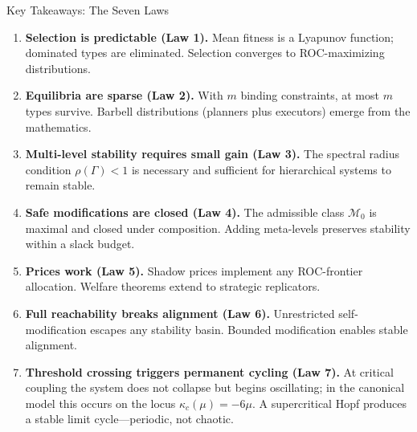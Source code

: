 \documentclass[12pt]{article}
\begin{document}

\begin{takeawaybox}{Key Takeaways: The Seven Laws}
\begin{enumerate}
    \item \textbf{Selection is predictable (Law 1).} Mean fitness is a Lyapunov function; dominated types are eliminated. Selection converges to ROC-maximizing distributions.
    
    \item \textbf{Equilibria are sparse (Law 2).} With $m$ binding constraints, at most $m$ types survive. Barbell distributions (planners plus executors) emerge from the mathematics.
    
    \item \textbf{Multi-level stability requires small gain (Law 3).} The spectral radius condition $\rho(\Gamma) < 1$ is necessary and sufficient for hierarchical systems to remain stable.
    
    \item \textbf{Safe modifications are closed (Law 4).} The admissible class $\mathcal{M}_0$ is maximal and closed under composition. Adding meta-levels preserves stability within a slack budget.
    
    \item \textbf{Prices work (Law 5).} Shadow prices implement any ROC-frontier allocation. Welfare theorems extend to strategic replicators.
    
    \item \textbf{Full reachability breaks alignment (Law 6).} Unrestricted self-modification escapes any stability basin. Bounded modification enables stable alignment.
    
    \item \textbf{Threshold crossing triggers permanent cycling (Law 7).} At critical coupling the system does not collapse but begins oscillating; in the canonical model this occurs on the locus $\kappa_c(\mu) = -6\mu$. A supercritical Hopf produces a stable limit cycle---periodic, not chaotic.
\end{enumerate}
\end{takeawaybox}

\end{document}
